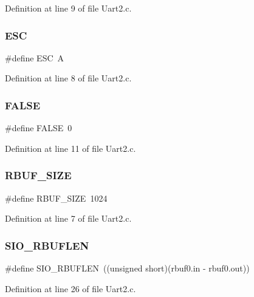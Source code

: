 Definition at line 9 of file Uart2.\+c.

\mbox{\label{_uart2_8c_a4af1b6159e447ba72652bb7fcdfa726e}} 
\subsubsection{E\+SC}
{\footnotesize\ttfamily \#define E\+SC~\textquotesingle{}A\textquotesingle{}}



Definition at line 8 of file Uart2.\+c.

\mbox{\label{_uart2_8c_aa93f0eb578d23995850d61f7d61c55c1}} 
\subsubsection{F\+A\+L\+SE}
{\footnotesize\ttfamily \#define F\+A\+L\+SE~0}



Definition at line 11 of file Uart2.\+c.

\mbox{\label{_uart2_8c_a3979138d69702d83185bef951f48dcd5}} 
\subsubsection{R\+B\+U\+F\+\_\+\+S\+I\+ZE}
{\footnotesize\ttfamily \#define R\+B\+U\+F\+\_\+\+S\+I\+ZE~1024}



Definition at line 7 of file Uart2.\+c.

\mbox{\label{_uart2_8c_a7922c9850fa59f9eda1fbf93bbb86a6f}} 
\subsubsection{S\+I\+O\+\_\+\+R\+B\+U\+F\+L\+EN}
{\footnotesize\ttfamily \#define S\+I\+O\+\_\+\+R\+B\+U\+F\+L\+EN~((unsigned short)(rbuf0.\+in -\/ rbuf0.\+out))}



Definition at line 26 of file Uart2.\+c.

